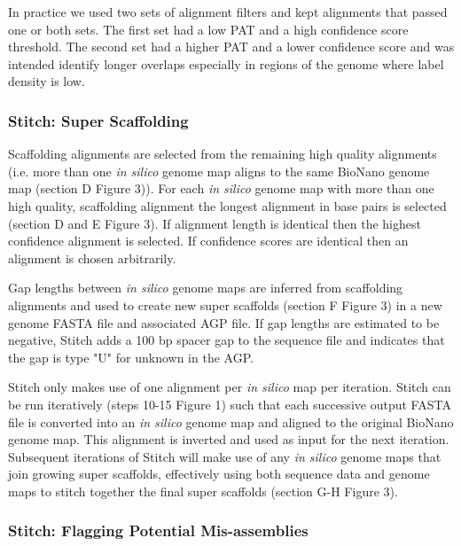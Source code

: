 \documentclass{bmcart}
\begin{document}
In practice we used two sets of alignment filters and kept alignments that passed one or both sets. The first set had a low PAT and a high confidence score threshold. The second set had a higher PAT and a lower confidence score and was intended identify longer overlaps especially in regions of the genome where label density is low.

\subsubsection*{Stitch: Super Scaffolding}

Scaffolding alignments are selected from the remaining high quality alignments (i.e. more than one \textit{in silico} genome map aligns to the same BioNano genome map (section D Figure 3)). For each \textit{in silico} genome map with more than one high quality, scaffolding alignment the longest alignment in base pairs is selected (section D and E Figure 3). If alignment length is identical then the highest confidence alignment is selected. If confidence scores are identical then an alignment is chosen arbitrarily.

Gap lengths between \textit{in silico} genome maps are inferred from scaffolding alignments and used to create new super scaffolds (section F Figure 3) in a new genome FASTA file and associated AGP file. If gap lengths are estimated to be negative, Stitch adds a 100 bp spacer gap to the sequence file and indicates that the gap is type "U" for unknown in the AGP. 

Stitch only makes use of one alignment per \textit{in silico} map per iteration. Stitch can be run iteratively (steps 10-15 Figure 1) such that each successive output FASTA file is converted into an \textit{in silico} genome map and aligned to the original BioNano genome map. This alignment is inverted and used as input for the next iteration. Subsequent iterations of Stitch will make use of any \textit{in silico} genome maps that join growing super scaffolds, effectively using both sequence data and genome maps to stitch together the final super scaffolds (section G-H Figure 3). 

\subsubsection*{Stitch: Flagging Potential Mis-assemblies}
\end{document}
